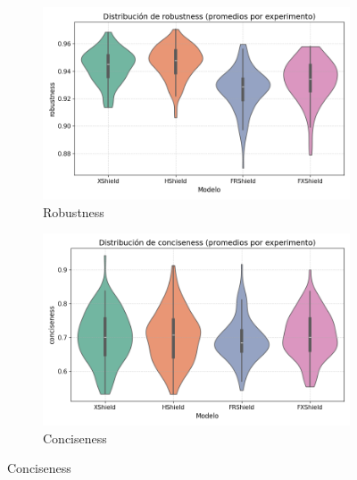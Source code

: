 \begin{figure}[H]
    \begin{subfigure}[b]{0.45\textwidth}
        \includegraphics[width=\linewidth]{images/boxplot_robustness.png}
        \caption{Robustness}
    \end{subfigure}
    \hfill
    \begin{subfigure}[b]{0.45\textwidth}
        \includegraphics[width=\linewidth]{images/boxplot_conciseness.png}
        \caption{Conciseness}
    \end{subfigure}


\end{figure}
